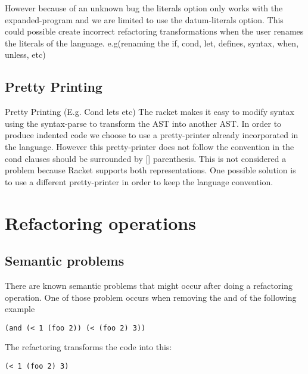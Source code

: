 However because of an unknown bug the literals option only works with the expanded-program %
and we are limited to use the datum-literals option. This could possible create
incorrect refactoring transformations when the user renames the literals of the
language. e.g(renaming the if, cond, let, defines, syntax, when, unless, etc)

\subsection{Pretty Printing}

Pretty Printing (E.g. Cond lets etc)
The racket makes it easy to modify syntax using the syntax-parse to transform the
AST into another AST.
In order to produce indented code we choose to use a pretty-printer already
incorporated in the language.
However this pretty-printer does not follow the convention in the cond clauses
should be surrounded by [] parenthesis. This is not considered a problem because
Racket supports both representations.
One possible solution is to use a different pretty-printer in
order to keep the language convention.


\section{Refactoring operations}

\subsection{Semantic problems}
There are known semantic problems that might occur after doing a refactoring
operation.
One of those problem occurs when removing the and of the following example
\begin{lstlisting}[basicstyle=\ttfamily, caption="Example"]
  (and (< 1 (foo 2)) (< (foo 2) 3))
\end{lstlisting}
The refactoring transforms the code into this:
\begin{lstlisting}[basicstyle=\ttfamily, caption="Example"]
  (< 1 (foo 2) 3)
\end{lstlisting}

